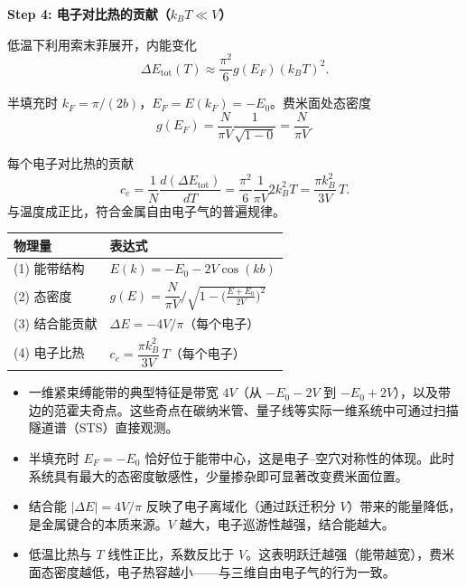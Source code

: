 \begin{derivationbox}[标准解题过程]
\textbf{Step 4: 电子对比热的贡献（$k_BT\ll V$）}

低温下利用索末菲展开，内能变化
\begin{equation}
\Delta E_{\text{tot}}(T)\approx\frac{\pi^2}{6}g(E_F)(k_BT)^2.
\end{equation}

半填充时 $k_F=\pi/(2b)$，$E_F=E(k_F)=-E_0$。费米面处态密度
\begin{equation}
g(E_F)=\frac{N}{\pi V}\frac{1}{\sqrt{1-0}}=\frac{N}{\pi V}.
\end{equation}

每个电子对比热的贡献
\begin{equation}
c_e=\frac{1}{N}\frac{d(\Delta E_{\text{tot}})}{dT}
=\frac{\pi^2}{6}\frac{1}{\pi V}2k_B^2T
=\boxed{\frac{\pi k_B^2}{3V}\,T.}
\end{equation}
与温度成正比，符合金属自由电子气的普遍规律。
\end{derivationbox}

\begin{formulabox}[答案汇总]
\begin{center}
\begin{tabular}{ll}
\toprule
\textbf{物理量} & \textbf{表达式} \\
\midrule
(1) 能带结构 & $E(k)=-E_0-2V\cos(kb)$ \\
(2) 态密度 & $g(E)=\dfrac{N}{\pi V}\bigl/\sqrt{1-\bigl(\frac{E+E_0}{2V}\bigr)^2}$ \\
(3) 结合能贡献 & $\Delta E=-4V/\pi$（每个电子） \\
(4) 电子比热 & $c_e=\dfrac{\pi k_B^2}{3V}\,T$（每个电子） \\
\bottomrule
\end{tabular}
\end{center}
\end{formulabox}

\begin{insightbox}[物理图像]
\begin{itemize}
    \item 一维紧束缚能带的典型特征是带宽 $4V$（从 $-E_0-2V$ 到 $-E_0+2V$），以及带边的范霍夫奇点。这些奇点在碳纳米管、量子线等实际一维系统中可通过扫描隧道谱（STS）直接观测。
    \item 半填充时 $E_F=-E_0$ 恰好位于能带中心，这是电子--空穴对称性的体现。此时系统具有最大的态密度敏感性，少量掺杂即可显著改变费米面位置。
    \item 结合能 $|\Delta E|=4V/\pi$ 反映了电子离域化（通过跃迁积分 $V$）带来的能量降低，是金属键合的本质来源。$V$ 越大，电子巡游性越强，结合能越大。
    \item 低温比热与 $T$ 线性正比，系数反比于 $V$。这表明跃迁越强（能带越宽），费米面态密度越低，电子热容越小——与三维自由电子气的行为一致。
\end{itemize}
\end{insightbox}
